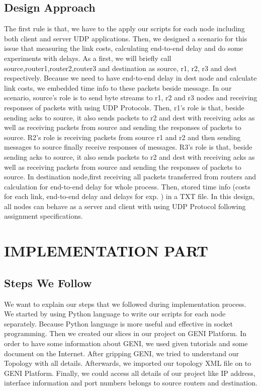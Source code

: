 \documentclass[letterpaper, 12 pt, conference]{ieeeconf}  %
\begin{document}
\subsection{ Design Approach }
The first rule is that, we have to the apply our scripts for each node including both client and server UDP applications. Then, we designed a scenario for this issue that measuring the link costs, calculating end-to-end delay and do some experiments with delays. As a first, we will briefly call source,router1,router2,router3 and destination as source, r1, r2, r3 and dest respectively. Because we need to have end-to-end delay in dest node and calculate link costs, we embedded time info to these packets beside message. In our scenario, source's role is to send byte streams to r1, r2 and r3 nodes and receiving responses of packets with using UDP Protocols. Then, r1's role is that, beside sending acks to source, it also sends packets to r2 and dest with receiving acks as well as receiving packets from source and sending the responses of packets to source. R2's role is receiving packets from source r1 and r2 and then sending messages to source finally receive responses of messages. R3's role is that, beside sending acks to source, it also sends packets to r2 and dest with receiving acks as well as receiving packets from source and sending the responses of packets to source. In destination node,first receiving all packets transferred from routers and calculation for end-to-end delay for whole process. Then, stored time info (costs for each link, end-to-end delay and delays for exp. ) in a TXT file.  In this design, all nodes can behave as a server and client with using UDP Protocol following assignment specifications.

\section{IMPLEMENTATION PART}

\subsection{Steps We Follow}

We want to explain our steps that we followed during implementation process. We started by using Python language to write our scripts for each node separately. Because Python language is more useful and effective in socket programming. Then we created our slices in our project on GENI Platform. In order to have some information about GENI, we used given tutorials and some document on the Internet. After gripping GENI, we tried to understand our Topology with all details. Afterwards, we imported our topology XML file on to GENI Platform. Finally, we could access all details of our project like IP address, interface information and port numbers belongs to source routers and destination.     
\end{document}
